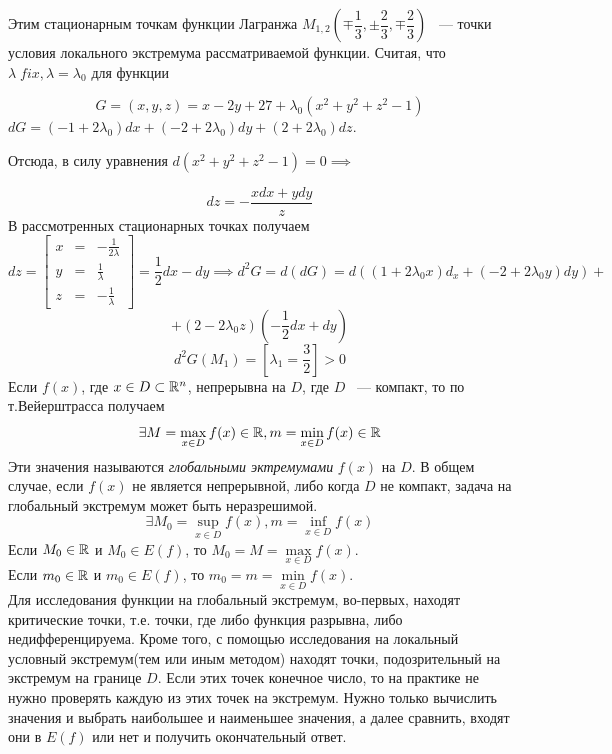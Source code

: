 \documentclass[../../main.tex]{subfiles}
\begin{document}
	Этим стационарным точкам функции Лагранжа $M_{1, 2} \left( \mp \dfrac{1}{3}, 
	\pm \dfrac{2}{3}, \mp \dfrac{2}{3} \right) $ ~--- точки условия локального
	экстремума рассматриваемой функции. Считая, что $\lambda\; fix, 
	\lambda = \lambda_0$ для функции
	
	\[G = \left( x, y, z \right) = x - 2y + 27 + 
	\lambda_0\left( x^2 + y^2 + z^2 - 1 \right)\]
	$
	dG = \left( -1 + 2 \lambda_0 \right)dx + \left( -2 + 2\lambda_0 \right)dy 
	+ \left( 2 + 2 \lambda_0 \right) dz $.
	\smallskip
	
	Отсюда, в силу 	уравнения $d\left( x^2 + y^2 + z^2 - 1 
	\right) = 0 \implies$
	
	\[ dz = - \frac{xdx + ydy}{z}\]
	В рассмотренных стационарных точках получаем
	\[ dz = \left[
	\begin{array}{ccc}
	x & = & -\frac{1}{2\lambda} \\
	y & = & \frac{1}{\lambda} \\
	z & = & -\frac{1}{\lambda}
	\end{array}
	\right] = \frac{1}{2}dx - dy \implies d^2G = d\left(dG\right) = 
	d\left(\left(1 + 2\lambda_0x\right)d_x + \left(-2 
	+ 2\lambda_0y\right)dy\right) +\] 
	\[ + \left(2 - 2\lambda_0z\right)\left(-\frac{1}{2}dx + dy\right) \] 
	\[d^2G(M_1) = \left[\lambda_1 = \frac{3}{2}\right] > 0\]
	Если $f\left(x\right)$, где $x \in D \subset \mathbb{R}^n$, непрерывна на $D$,
	где $D$ ~--- компакт, то по т.Вейерштрасса получаем
	\[ \exists M = \max\limits_{x \in D} f(x) \in \mathbb{R},
	m = \min\limits_{x \in D} f(x) \in \mathbb{R} \]
	Эти значения называются \emph{глобальными эктремумами} $f(x)$ на $D$.
	В общем случае, если $f(x)$ не является непрерывной, либо когда $D$ 
	не компакт, задача на глобальный экстремум может быть неразрешимой.
	\[ \exists M_0 = \sup\limits_{x \in D} f(x),
	m = \inf\limits_{x \in D} f(x) \]
	Если $M_0 \in \mathbb{R}$ и $M_0 \in E(f)$, то $M_0 = M = 
	\max\limits_{x \in D} f(x)$. \\
	Если $m_0 \in \mathbb{R}$ и $m_0 \in E(f)$, то $m_0 = m = 
	\min\limits_{x \in D} f(x)$. \\
	Для исследования функции на глобальный экстремум, во-первых, 
	находят критические точки, т.е. точки, 
	где либо функция разрывна, либо недифференцируема. Кроме того, с помощью 
	исследования на локальный условный экстремум(тем или иным методом)
	находят точки, подозрительный на экстремум на границе $D$.
	Если этих точек конечное число, то на практике не нужно проверять каждую из 
	этих точек на экстремум.
	Нужно только вычислить значения и выбрать наибольшее и наименьшее значения, 
	а далее сравнить, входят они в $E(f)$ или нет и 
	получить окончательный ответ.\\
	
\end{document}
